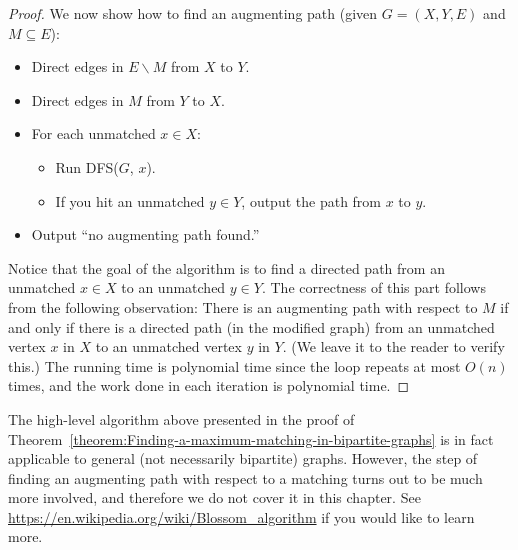 \begin{flex}
\begin{proof}
We now show how to find an augmenting path (given $G = (X,Y,E)$ and $M \subseteq E$):
\begin{itemize}
    \item Direct edges in $E \backslash M$ from $X$ to $Y$.
    \item Direct edges in $M$ from $Y$ to $X$. 
    \item For each unmatched $x \in X$:
    \begin{itemize}
        \item Run DFS($G$, $x$).
        \item If you hit an unmatched $y \in Y$, output the path from $x$ to $y$.
    \end{itemize}
    \item Output ``no augmenting path found.''
\end{itemize}
Notice that the goal of the algorithm is to find a directed path from an unmatched $x \in X$ to an unmatched $y \in Y$. The correctness of this part follows from the following observation: There is an augmenting path with respect to $M$ if and only if there is a directed path (in the modified graph) from an unmatched vertex $x$ in $X$ to an unmatched vertex $y$ in $Y$. (We leave it to the reader to verify this.) The running time is polynomial time since the loop repeats at most $O(n)$ times, and the work done in each iteration is polynomial time.

\end{proof}
\end{flex}

\begin{note}
\label{note:Finding-a-maximum-matching-in-non-bipartite-graphs}
The high-level algorithm above presented in the proof of Theorem~\ref{theorem:Finding-a-maximum-matching-in-bipartite-graphs} is in fact applicable to general (not necessarily bipartite) graphs. However, the step of finding an augmenting path with respect to a matching turns out to be much more involved, and therefore we do not cover it in this chapter. See \url{https://en.wikipedia.org/wiki/Blossom_algorithm} if you would like to learn more.

\end{note}

